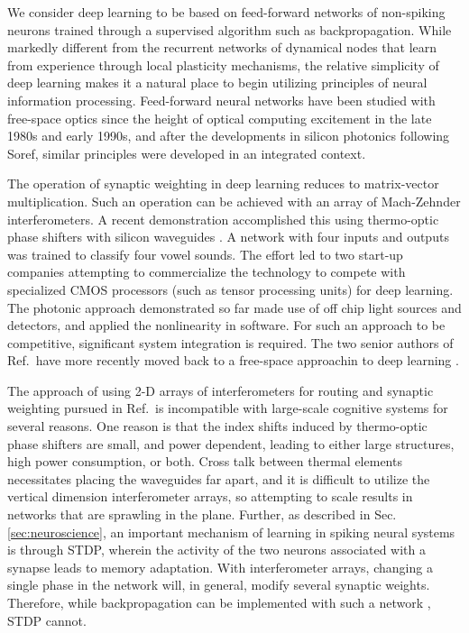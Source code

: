 \documentclass[twocolumn]{article}
\begin{document}
We consider deep learning to be based on feed-forward networks of non-spiking neurons trained through a supervised algorithm such as backpropagation. While markedly different from the recurrent networks of dynamical nodes that learn from experience through local plasticity mechanisms, the relative simplicity of deep learning makes it a natural place to begin utilizing principles of neural information processing. Feed-forward neural networks have been studied with free-space optics since the height of optical computing excitement in the late 1980s and early 1990s, and after the developments in silicon photonics following Soref, similar principles were developed in an integrated context. 

The operation of synaptic weighting in deep learning reduces to matrix-vector multiplication. Such an operation can be achieved with an array of Mach-Zehnder interferometers. A recent demonstration accomplished this using thermo-optic phase shifters with silicon waveguides \cite{shha2016}. A network with four inputs and outputs was trained to classify four vowel sounds. The effort led to two start-up companies attempting to commercialize the technology to compete with specialized CMOS processors (such as tensor processing units) for deep learning. The photonic approach demonstrated so far made use of off chip light sources and detectors, and applied the nonlinearity in software. For such an approach to be competitive, significant system integration is required. The two senior authors of Ref.\,\cite{shha2016} have more recently moved back to a free-space approachin to deep learning \cite{}.

The approach of using 2-D arrays of interferometers for routing and synaptic weighting pursued in Ref.\,\cite{shha2016} is incompatible with large-scale cognitive systems for several reasons. One reason is that the index shifts induced by thermo-optic phase shifters are small, and power dependent, leading to either large structures, high power consumption, or both. Cross talk between thermal elements necessitates placing the waveguides far apart, and it is difficult to utilize the vertical dimension interferometer arrays, so attempting to scale results in networks that are sprawling in the plane. Further, as described in Sec.\,\ref{sec:neuroscience}, an important mechanism of learning in spiking neural systems is through STDP, wherein the activity of the two neurons associated with a synapse leads to memory adaptation. With interferometer arrays, changing a single phase in the network will, in general, modify several synaptic weights. Therefore, while backpropagation can be implemented with such a network \cite{}, STDP cannot. 
\end{document}
